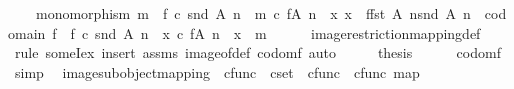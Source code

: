 \begin{isabellebody}
\ \ \ \ monomorphism\ m\ {\isasymand}\ f\ {\isasymcirc}\isactrlsub c\ snd\ {\isacharparenleft}{\kern0pt}A{\isacharcomma}{\kern0pt}\ n{\isacharparenright}{\kern0pt}\ {\isacharequal}{\kern0pt}\ m\ {\isasymcirc}\isactrlsub c\ {\isacharparenleft}{\kern0pt}f{\isasymrestriction}\isactrlbsub {\isacharparenleft}{\kern0pt}A{\isacharcomma}{\kern0pt}\ n{\isacharparenright}{\kern0pt}\isactrlesub {\isacharparenright}{\kern0pt}\ {\isasymand}\ {\isacharparenleft}{\kern0pt}{\isasymforall}x{\isachardot}{\kern0pt}\ x\ {\isacharcolon}{\kern0pt}\ f{\isasymlparr}fst\ {\isacharparenleft}{\kern0pt}A{\isacharcomma}{\kern0pt}\ n{\isacharparenright}{\kern0pt}{\isasymrparr}\isactrlbsub snd\ {\isacharparenleft}{\kern0pt}A{\isacharcomma}{\kern0pt}\ n{\isacharparenright}{\kern0pt}\isactrlesub \ {\isasymrightarrow}\ codomain\ f\ {\isasymlongrightarrow}\ f\ {\isasymcirc}\isactrlsub c\ snd\ {\isacharparenleft}{\kern0pt}A{\isacharcomma}{\kern0pt}\ n{\isacharparenright}{\kern0pt}\ {\isacharequal}{\kern0pt}\ x\ {\isasymcirc}\isactrlsub c\ {\isacharparenleft}{\kern0pt}f{\isasymrestriction}\isactrlbsub {\isacharparenleft}{\kern0pt}A{\isacharcomma}{\kern0pt}\ n{\isacharparenright}{\kern0pt}\isactrlesub {\isacharparenright}{\kern0pt}\ {\isasymlongrightarrow}\ x\ {\isacharequal}{\kern0pt}\ m{\isacharparenright}{\kern0pt}{\isachardoublequoteclose}\isanewline
\ \ \ \ \isamarkupfalse%
\ image{\isacharunderscore}{\kern0pt}restriction{\isacharunderscore}{\kern0pt}mapping{\isacharunderscore}{\kern0pt}def\ \isamarkupfalse%
\ {\isacharparenleft}{\kern0pt}rule\ someI{\isacharunderscore}{\kern0pt}ex{\isacharcomma}{\kern0pt}\ insert\ assms\ image{\isacharunderscore}{\kern0pt}of{\isacharunderscore}{\kern0pt}def{}\ codom{\isacharunderscore}{\kern0pt}f{\isacharcomma}{\kern0pt}\ auto{\isacharparenright}{\kern0pt}\isanewline
\ \ \isamarkupfalse%
\ \isamarkupfalse%
\ {\isacharquery}{\kern0pt}thesis\isanewline
\ \ \ \ \isamarkupfalse%
\ codom{\isacharunderscore}{\kern0pt}f\ \isamarkupfalse%
\ simp\ \isanewline
{}\isamarkupfalse%
%
\endisatagproof
{\isafoldproof}%
%
\isadelimproof
\isanewline
%
\endisadelimproof
\isanewline
{}\isamarkupfalse%
\ image{\isacharunderscore}{\kern0pt}subobject{\isacharunderscore}{\kern0pt}mapping\ {\isacharcolon}{\kern0pt}{\isacharcolon}{\kern0pt}\ {\isachardoublequoteopen}cfunc\ {\isasymRightarrow}\ cset\ {\isasymRightarrow}\ cfunc\ {\isasymRightarrow}\ cfunc{\isachardoublequoteclose}\ {\isacharparenleft}{\kern0pt}{\isachardoublequoteopen}{\isacharbrackleft}{\kern0pt}{\isacharunderscore}{\kern0pt}{\isasymlparr}{\isacharunderscore}{\kern0pt}{\isasymrparr}\isactrlbsub {\isacharunderscore}{\kern0pt}\isactrlesub {\isacharbrackright}{\kern0pt}map{\isachardoublequoteclose}\ {\isacharbrackleft}{\kern0pt}{}{}{}{\isacharcomma}{\kern0pt}{}{\isacharcomma}{\kern0pt}{}{\isacharbrackright}{\kern0pt}{}{}{}{\isacharparenright}{\kern0pt}\ \isanewline

\end{isabellebody}
